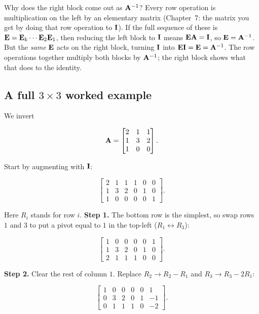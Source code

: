 Why does the right block come out as $\mathbf{A}^{-1}$? Every row operation is
multiplication on the left by an elementary matrix (Chapter~7: the matrix you get by
doing that row operation to $\mathbf{I}$). If the full sequence of these is
$\mathbf{E} = \mathbf{E}_k\cdots\mathbf{E}_2\mathbf{E}_1$, then reducing the left block to $\mathbf{I}$
means $\mathbf{E}\mathbf{A} = \mathbf{I}$, so $\mathbf{E} = \mathbf{A}^{-1}$. But the \emph{same}
$\mathbf{E}$ acts on the right block, turning $\mathbf{I}$ into $\mathbf{E}\mathbf{I} = \mathbf{E} =
\mathbf{A}^{-1}$. The row operations together multiply both blocks by $\mathbf{A}^{-1}$; the
right block shows what that does to the identity.

\subsection{A full $3\times3$ worked example}

We invert

\[
\mathbf{A} = \begin{bmatrix} 2 & 1 & 1 \\ 1 & 3 & 2 \\ 1 & 0 & 0 \end{bmatrix}.
\]

Start by augmenting with $\mathbf{I}$:

\[
\left[\begin{array}{ccc|ccc}
2 & 1 & 1 & 1 & 0 & 0 \\
1 & 3 & 2 & 0 & 1 & 0 \\
1 & 0 & 0 & 0 & 0 & 1
\end{array}\right].
\]

Here $R_i$ stands for row $i$. \textbf{Step 1.} The bottom row is the simplest, so swap
rows $1$ and $3$ to put a pivot equal to $1$ in the top-left ($R_1 \leftrightarrow R_3$):

\[
\left[\begin{array}{ccc|ccc}
1 & 0 & 0 & 0 & 0 & 1 \\
1 & 3 & 2 & 0 & 1 & 0 \\
2 & 1 & 1 & 1 & 0 & 0
\end{array}\right].
\]

\textbf{Step 2.} Clear the rest of column $1$. Replace $R_2 \to R_2 - R_1$ and
$R_3 \to R_3 - 2R_1$:

\[
\left[\begin{array}{ccc|ccc}
1 & 0 & 0 & 0 & 0 & 1 \\
0 & 3 & 2 & 0 & 1 & -1 \\
0 & 1 & 1 & 1 & 0 & -2
\end{array}\right].
\]

